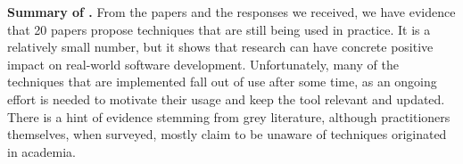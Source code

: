 \begin{tcolorbox}%
\textbf{Summary of .} From the papers and the responses we received, we have evidence that 20 papers propose techniques that are still being used in practice.
It is a relatively small number, but it shows that \rt research can have concrete positive impact on real-world software development.
Unfortunately, many of the techniques that are implemented fall out of use after some time, as an ongoing effort is needed to motivate their usage and keep the tool relevant and updated.
There is a hint of evidence stemming from grey literature, although practitioners themselves, when surveyed, mostly claim to be unaware of \rt techniques originated in academia.
\end{tcolorbox}

